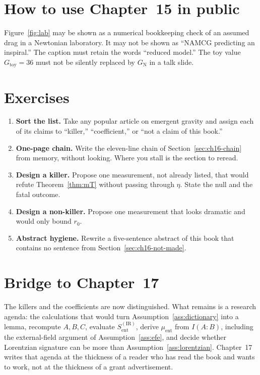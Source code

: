 \section{How to use Chapter~15 in public}
\label{sec:ch16-public}

Figure~\ref{fig:lab} may be shown as a numerical bookkeeping check of
an assumed drag in a Newtonian laboratory. It may not be
shown as ``NAMCG predicting an inspiral.'' The caption must
retain the words ``reduced model.'' The toy value
\(G_{\mathrm{toy}}=36\) must not be silently replaced by
\(G_{\mathrm{N}}\) in a talk slide.

\section{Exercises}
\label{sec:ch16-exercises}

\begin{enumerate}
  \item \textbf{Sort the list.}
    Take any popular article on emergent gravity and assign each
    of its claims to ``killer,'' ``coefficient,'' or ``not a
    claim of this book.''
  \item \textbf{One-page chain.}
    Write the eleven-line chain of Section~\ref{sec:ch16-chain}
    from memory, without looking. Where you stall is the section
    to reread.
  \item \textbf{Design a killer.}
    Propose one measurement, not already listed, that would
    refute Theorem~\ref{thm:mT} without passing through
    \(\eta\). State the null and the fatal outcome.
  \item \textbf{Design a non-killer.}
    Propose one measurement that looks dramatic and would only
    bound \(r_0\).
  \item \textbf{Abstract hygiene.}
    Rewrite a five-sentence abstract of this book that contains
    no sentence from Section~\ref{sec:ch16-not-made}.
\end{enumerate}

\section{Bridge to Chapter~17}
\label{sec:ch16-bridge}

The killers and the coefficients are now distinguished. What
remains is a research agenda: the calculations that would turn
Assumption~\ref{ass:dictionary} into a lemma, recompute
\(A,B,C\), evaluate \(S_{\mathrm{ent}}^{\mathrm{(IR)}}\), derive
\(\mu_{\mathrm{ent}}\) from \(I(A:B)\), including the external-field argument of Assumption~\ref{ass:efe}, and decide whether
Lorentzian signature can be more than Assumption~\ref{ass:lorentzian}.
Chapter~17 writes that agenda at the thickness of a reader who
has read the book and wants to work, not at the thickness of a
grant advertisement.